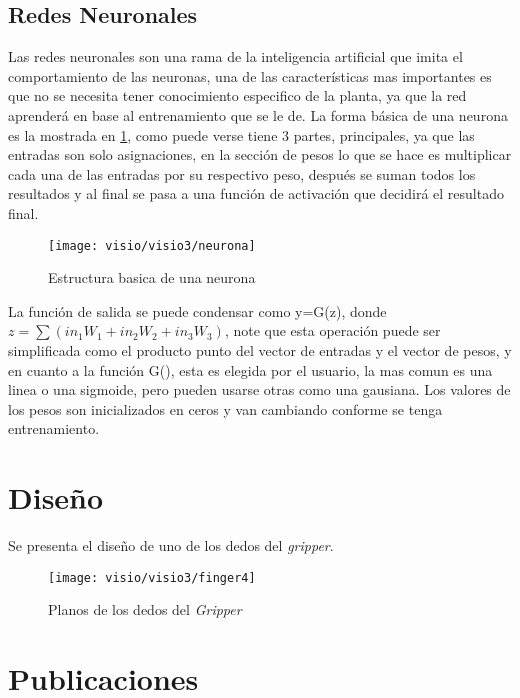 \section{Redes Neuronales}
Las redes neuronales son una rama de la inteligencia artificial que imita el comportamiento de las neuronas, una de las características mas importantes es que no se necesita tener conocimiento especifico de la planta, ya que la red aprenderá en base al entrenamiento que se le de. La forma básica de una neurona es la mostrada en \cref{fig:neurona}, como puede verse tiene 3 partes, principales, ya que las entradas son solo asignaciones, en la sección de pesos lo que se hace es multiplicar cada una de las entradas por su respectivo peso, después se suman todos los resultados y al final se pasa a una función de activación que decidirá el resultado final. 
\begin{figure}[h]
	\centering
	\texttt{[image: visio/visio3/neurona]}
	\caption{Estructura basica de una neurona}
	\label{fig:neurona}
\end{figure}
La función de salida se puede condensar como y=G(z), donde $ z=\sum(in_1 W_1 + in_2 W_2 + in_3 W_3)$, note que esta operación puede ser simplificada como el producto punto del vector de entradas y el vector de pesos, y en cuanto a la función G(), esta es elegida por el usuario, la mas comun es una linea o una sigmoide, pero pueden usarse otras como una gausiana. Los valores de los pesos son inicializados en ceros y van cambiando conforme se tenga entrenamiento.



\chapter{Diseño}\label{diseno}
Se presenta el diseño de uno de los dedos del \textit{gripper}.

\begin{figure}[h]
	\centering
	\texttt{[image: visio/visio3/finger4]}
	\caption{Planos de los dedos del \textit{Gripper}}
	\label{fig:finger4}
\end{figure}

\chapter{Publicaciones}\label{publicaciones}
\cite{tuyinincluded2017}
